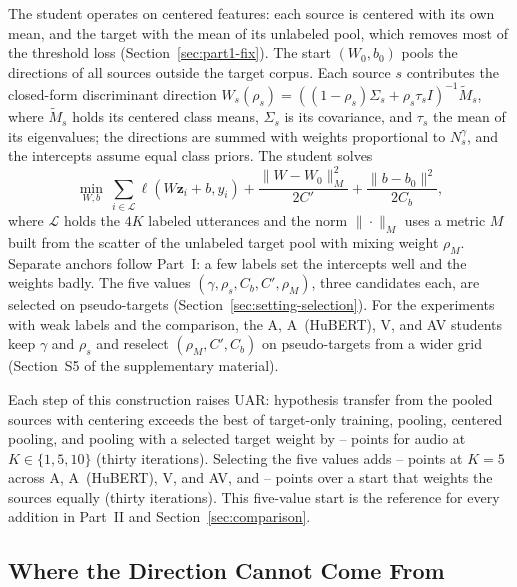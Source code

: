 The student operates on centered features: each source is centered with its own mean, and the target with the mean of its unlabeled pool, which removes most of the threshold loss (Section~\ref{sec:part1-fix}).
The start $(W_0, b_0)$ pools the directions of all sources outside the target corpus.
Each source $s$ contributes the closed-form discriminant direction $W_s(\rho_s) = ((1-\rho_s)\Sigma_s + \rho_s \tau_s I)^{-1}\tilde{M}_s$, where $\tilde{M}_s$ holds its centered class means, $\Sigma_s$ is its covariance, and $\tau_s$ the mean of its eigenvalues; the directions are summed with weights proportional to $N_s^{\gamma}$, and the intercepts assume equal class priors.
The student solves
\begin{equation}
\label{eq:student}
\min_{W, b}\ \sum_{i \in \mathcal{L}} \ell\!\left(W \mathbf{z}_i + b, y_i\right) + \frac{\|W - W_0\|_{M}^2}{2C'} + \frac{\|b - b_0\|^2}{2C_b},
\end{equation}
where $\mathcal{L}$ holds the $4K$ labeled utterances and the norm $\|\cdot\|_M$ uses a metric $M$ built from the scatter of the unlabeled target pool with mixing weight $\rho_M$.
Separate anchors follow Part~I: a few labels set the intercepts well and the weights badly.
The five values $(\gamma, \rho_s, C_b, C', \rho_M)$, three candidates each, are selected on pseudo-targets (Section~\ref{sec:setting-selection}).
For the experiments with weak labels and the comparison, the A, A~(HuBERT), V, and AV students keep $\gamma$ and $\rho_s$ and reselect $(\rho_M, C', C_b)$ on pseudo-targets from a wider grid (Section~S5 of the supplementary material).

Each step of this construction raises UAR: hypothesis transfer from the pooled sources with centering exceeds the best of target-only training, pooling, centered pooling, and pooling with a selected target weight by -- points for audio at $K \in \{1, 5, 10\}$ (thirty iterations).
Selecting the five values adds -- points at $K=5$ across A, A~(HuBERT), V, and AV, and -- points over a start that weights the sources equally (thirty iterations).
This five-value start is the reference for every addition in Part~II and Section~\ref{sec:comparison}.

\subsection{Where the Direction Cannot Come From}
\label{sec:part2-limits}

